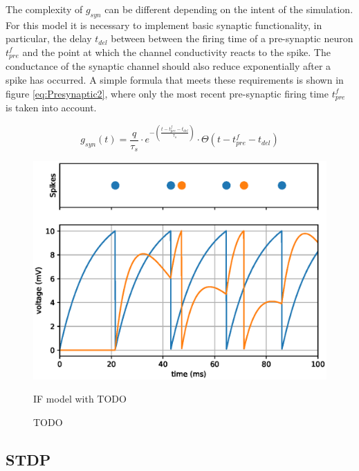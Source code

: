 The complexity of $g_{syn}$ can be different depending on the intent of the
simulation. For this model it is necessary to implement basic synaptic
functionality, in particular, the delay $t_{del}$ between between the firing
time of a pre-synaptic neuron $t^f_{pre}$ and the point at which the channel
conductivity reacts to the spike. The conductance of the synaptic channel should
also reduce exponentially after a spike has occurred. A simple formula that meets these requirements 
is shown in figure \ref{eq:Presynaptic2}, where only the most recent
pre-synaptic firing time $t^f_{pre}$ is taken into account.

\begin{equation}\label{eq:Presynaptic2}
    g_{syn}(t) = \frac{q}{\tau_s}\cdot e^{-(\frac{t-t^f_{pre}-t_{del}}{\tau_s})} \cdot \Theta(t-t^f_{pre}-t_{del})
\end{equation}



\begin{figure}[h!]
    \centering
    \includegraphics[width=.6\linewidth]{figures/graphs/dualSpikingNeuron.eps}
    \caption{IF model with TODO}
    \caption{TODO}
    \label{fig:LIFDoubleGraph}
\end{figure}


\subsection{STDP}

